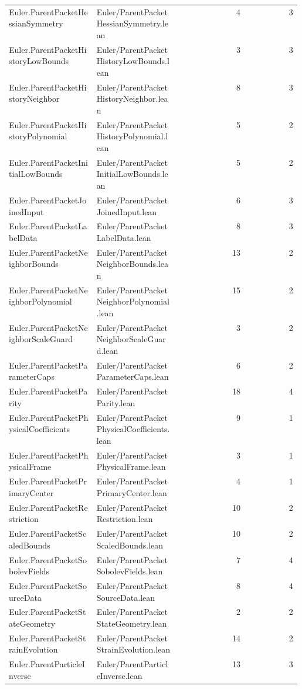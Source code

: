 \begin{longtable}{p{0.30\linewidth}p{0.28\linewidth}rr}
Euler.ParentPacketHessianSymmetry & Euler/ParentPacketHessianSymmetry.lean & 4 & 3\\
Euler.ParentPacketHistoryLowBounds & Euler/ParentPacketHistoryLowBounds.lean & 3 & 3\\
Euler.ParentPacketHistoryNeighbor & Euler/ParentPacketHistoryNeighbor.lean & 8 & 3\\
Euler.ParentPacketHistoryPolynomial & Euler/ParentPacketHistoryPolynomial.lean & 5 & 2\\
Euler.ParentPacketInitialLowBounds & Euler/ParentPacketInitialLowBounds.lean & 5 & 2\\
Euler.ParentPacketJoinedInput & Euler/ParentPacketJoinedInput.lean & 6 & 3\\
Euler.ParentPacketLabelData & Euler/ParentPacketLabelData.lean & 8 & 3\\
Euler.ParentPacketNeighborBounds & Euler/ParentPacketNeighborBounds.lean & 13 & 2\\
Euler.ParentPacketNeighborPolynomial & Euler/ParentPacketNeighborPolynomial.lean & 15 & 2\\
Euler.ParentPacketNeighborScaleGuard & Euler/ParentPacketNeighborScaleGuard.lean & 3 & 2\\
Euler.ParentPacketParameterCaps & Euler/ParentPacketParameterCaps.lean & 6 & 2\\
Euler.ParentPacketParity & Euler/ParentPacketParity.lean & 18 & 4\\
Euler.ParentPacketPhysicalCoefficients & Euler/ParentPacketPhysicalCoefficients.lean & 9 & 1\\
Euler.ParentPacketPhysicalFrame & Euler/ParentPacketPhysicalFrame.lean & 3 & 1\\
Euler.ParentPacketPrimaryCenter & Euler/ParentPacketPrimaryCenter.lean & 4 & 1\\
Euler.ParentPacketRestriction & Euler/ParentPacketRestriction.lean & 10 & 2\\
Euler.ParentPacketScaledBounds & Euler/ParentPacketScaledBounds.lean & 10 & 2\\
Euler.ParentPacketSobolevFields & Euler/ParentPacketSobolevFields.lean & 7 & 4\\
Euler.ParentPacketSourceData & Euler/ParentPacketSourceData.lean & 8 & 4\\
Euler.ParentPacketStateGeometry & Euler/ParentPacketStateGeometry.lean & 2 & 2\\
Euler.ParentPacketStrainEvolution & Euler/ParentPacketStrainEvolution.lean & 14 & 2\\
Euler.ParentParticleInverse & Euler/ParentParticleInverse.lean & 13 & 3\\

\end{longtable}
